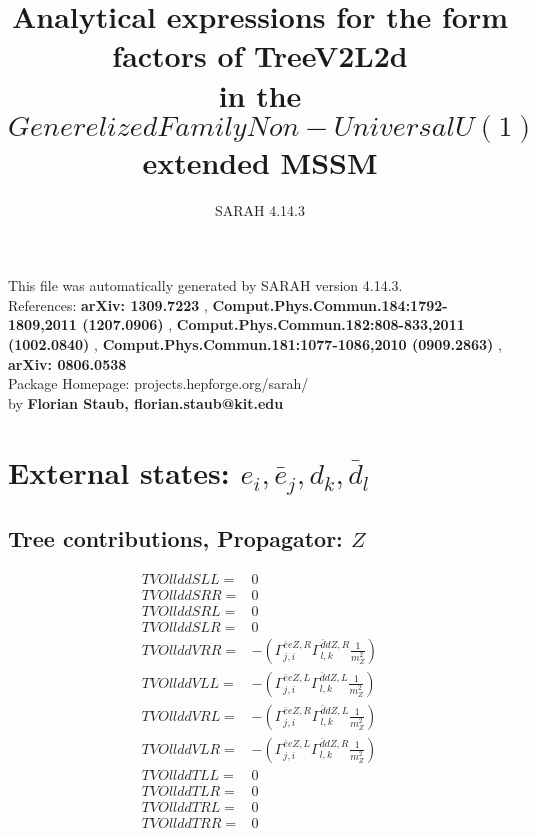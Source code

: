 \documentclass[A4,landscape]{article}
\begin{document}
\title{Analytical expressions for the form factors of TreeV2L2d\\ in the $Generelized Family Non-Universal U(1)$ extended MSSM } 
 \author{SARAH 4.14.3} 
 \maketitle 
 \vspace{10cm} 
This file was automatically generated by SARAH version 4.14.3.  \\ 
References: {\bf arXiv: 1309.7223 }, {\bf Comput.Phys.Commun.184:1792-1809,2011 (1207.0906) }, {\bf Comput.Phys.Commun.182:808-833,2011 (1002.0840) }, {\bf Comput.Phys.Commun.181:1077-1086,2010 (0909.2863) }, {\bf arXiv: 0806.0538 } \\ 
Package Homepage: projects.hepforge.org/sarah/ \\ 
by {\bf Florian Staub, florian.staub@kit.edu} 
 \pagebreak 
 \tableofcontents 
 \pagebreak 
\section{External states: ${e_{{i}}, \bar{e}_{{j}}, d_{{k}}, \bar{d}_{{l}}}$} 
\subsection{Tree contributions, Propagator: $Z$} 

\begin{align} 
  TVOllddSLL= & 0 \\ 
  TVOllddSRR= & 0 \\ 
  TVOllddSRL= & 0 \\ 
  TVOllddSLR= & 0 \\ 
  TVOllddVRR= & -(\Gamma^{\bar{e}e Z ,R}_{j, i} \Gamma^{\bar{d}d Z ,R}_{l, k} \frac{1}{m^2_{Z}}) \\ 
  TVOllddVLL= & -(\Gamma^{\bar{e}e Z ,L}_{j, i} \Gamma^{\bar{d}d Z ,L}_{l, k} \frac{1}{m^2_{Z}}) \\ 
  TVOllddVRL= & -(\Gamma^{\bar{e}e Z ,R}_{j, i} \Gamma^{\bar{d}d Z ,L}_{l, k} \frac{1}{m^2_{Z}}) \\ 
  TVOllddVLR= & -(\Gamma^{\bar{e}e Z ,L}_{j, i} \Gamma^{\bar{d}d Z ,R}_{l, k} \frac{1}{m^2_{Z}}) \\ 
  TVOllddTLL= & 0 \\ 
  TVOllddTLR= & 0 \\ 
  TVOllddTRL= & 0 \\ 
  TVOllddTRR= & 0 \\ 
\end{align} 
\end{document}
